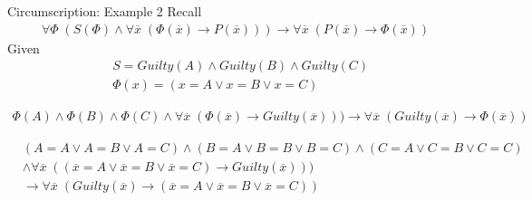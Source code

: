 \documentclass[8pt]{beamer}
\newcommand{\myfootnote}[1]{
    \renewcommand{\thefootnote}{}
    \footnotetext{\hspace{-4pt}\scriptsize#1}
    \renewcommand{\thefootnote}{\arabic{footnote}}
}
\begin{document}
\begin{frame}{Circumscription: Example 2}
Recall
\begin{equation*}
\begin{split}
\forall \Phi \; (S(\Phi) \wedge  \forall \overline{x} \; (\Phi(\overline{x})\to P(\overline{x}))) \to \forall \overline{x} \; (P(\overline{x}) \to \Phi(\overline{x}))
\end{split}
\end{equation*} 
Given
\begin{equation*}
\begin{split}
&S = Guilty(A) \wedge Guilty(B) \wedge Guilty(C) \\
&\Phi(x) = (x=A \vee x=B \vee x=C)
\end{split}
\end{equation*}

\begin{equation*}
\begin{split}
\Phi(A) \wedge \Phi(B) \wedge \Phi(C) \wedge \forall \overline{x} \; (\Phi(\overline{x})\to Guilty(\overline{x}))) \to \forall \overline{x} \; (Guilty(\overline{x}) \to \Phi(\overline{x}))
\end{split}
\end{equation*}

\begin{equation*}
\begin{split}
&(A=A \vee A=B \vee A=C)\wedge (B=A \vee B=B \vee B=C) \wedge (C=A \vee C=B \vee C=C) \\
& \wedge \forall \overline{x} \; ((\overline{x}=A \vee \overline{x}=B \vee \overline{x}=C)\to Guilty(\overline{x})))  \\
& \to  \forall \overline{x} \; (Guilty(\overline{x})   \to  (\overline{x}=A \vee \overline{x}=B \vee \overline{x}=C))
\end{split}
\end{equation*} 
\myfootnote{\cite{mccarthy1981circumscription}}

\end{frame}
\end{document}
